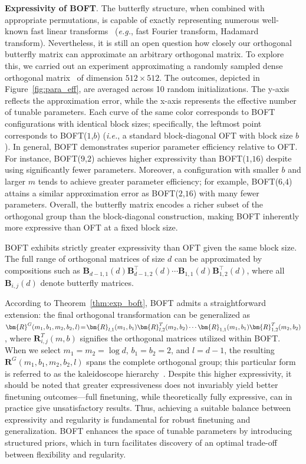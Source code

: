 \textbf{Expressivity of BOFT}. The butterfly structure, when combined with appropriate permutations, is capable of exactly representing numerous well-known fast linear transforms~\cite{dao2019learning,dao2019kaleidoscope} (\emph{e.g.}, fast Fourier transform, Hadamard transform). Nevertheless, it is still an open question how closely our orthogonal butterfly matrix can approximate an arbitrary orthogonal matrix. To explore this, we carried out an experiment approximating a randomly sampled dense orthogonal matrix~\cite{anderson1987generation} of dimension $512\times 512$. The outcomes, depicted in Figure~\ref{fig:para_eff}, are averaged across 10 random initializations. The y-axis reflects the approximation error, while the x-axis represents the effective number of tunable parameters. Each curve of the same color corresponds to BOFT configurations with identical block sizes; specifically, the leftmost point corresponds to BOFT($1$,$b$) (\emph{i.e.}, a standard block-diagonal OFT with block size $b$). In general, BOFT demonstrates superior parameter efficiency relative to OFT. For instance, BOFT($9$,$2$) achieves higher expressivity than BOFT($1$,$16$) despite using significantly fewer parameters. Moreover, a configuration with smaller $b$ and larger $m$ tends to achieve greater parameter efficiency; for example, BOFT($6$,$4$) attains a similar approximation error as BOFT($2$,$16$) with many fewer parameters. Overall, the butterfly matrix encodes a richer subset of the orthogonal group than the block-diagonal construction, making BOFT inherently more expressive than OFT at a fixed block size.

\begin{theorem}\label{thm:exp_boft}
    BOFT exhibits strictly greater expressivity than OFT given the same block size. The full range of orthogonal matrices of size $d$ can be approximated by compositions such as $\bm{B}_{d-1,1}(d)\bm{B}^\top_{d-1,2}(d)\cdots\bm{B}_{1,1}(d)\bm{B}^\top_{1,2}(d)$, where all $\bm{B}_{i,j}(d)$ denote butterfly matrices.
\end{theorem}

According to Theorem~\ref{thm:exp_boft}, BOFT admits a straightforward extension: the final orthogonal transformation can be generalized as $\thickmuskip=2mu \medmuskip=2mu \bm{R}^G(m_1,b_1,m_2,b_2,l)=\bm{R}_{l,1}(m_1,b_1)\bm{R}_{l,2}^T(m_2,b_2)\cdots\bm{R}_{1,1}(m_1,b_1)\bm{R}_{1,2}^T(m_2,b_2)$, where $\bm{R}_{i,j}^T(m,b)$ signifies the orthogonal matrices utilized within BOFT. When we select $m_1=m_2=\log d$, $b_1=b_2=2$, and $l=d-1$, the resulting $\bm{R}^G(m_1,b_1,m_2,b_2,l)$ spans the complete orthogonal group; this particular form is referred to as the kaleidoscope hierarchy~\cite{dao2019kaleidoscope}. Despite this higher expressivity, it should be noted that greater expressiveness does not invariably yield better finetuning outcomes—full finetuning, while theoretically fully expressive, can in practice give unsatisfactory results. Thus, achieving a suitable balance between expressivity and regularity is fundamental for robust finetuning and generalization. BOFT enhances the space of tunable parameters by introducing structured priors, which in turn facilitates discovery of an optimal trade-off between flexibility and regularity.

